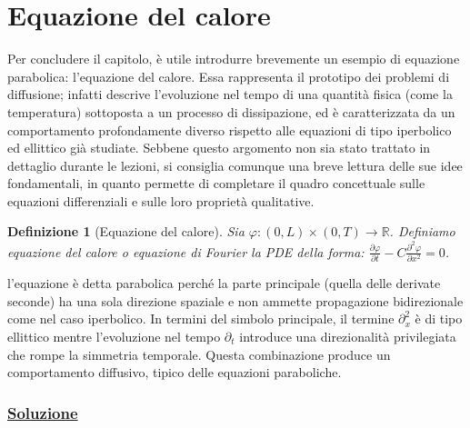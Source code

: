 \documentclass[a4paper,12pt]{report}
\newtheorem{definizione}{Definizione}[chapter]
\newcommand{\pd}[2]{\frac{\partial #1}{\partial #2}}
\newcommand{\pdd}[2]{\frac{\partial^2 #1}{\partial #2^2}}
\begin{document}
\section{Equazione del calore}

Per concludere il capitolo, è utile introdurre brevemente un esempio di equazione parabolica: l’equazione del calore. Essa rappresenta il prototipo dei problemi di diffusione; infatti descrive l’evoluzione nel tempo di una quantità fisica (come la temperatura) sottoposta a un processo di dissipazione, ed è caratterizzata da un comportamento profondamente diverso rispetto alle equazioni di tipo iperbolico ed ellittico già studiate. Sebbene questo argomento non sia stato trattato in dettaglio durante le lezioni, si consiglia comunque una breve lettura delle sue idee fondamentali, in quanto permette di completare il quadro concettuale sulle equazioni differenziali e sulle loro proprietà qualitative.

\begin{definizione}[Equazione del calore]
    Sia $\varphi:(0,L)\times(0,T)\to \mathbb{R}$. Definiamo equazione del calore o equazione di Fourier la PDE della forma: $\displaystyle\pd{\varphi}{t}-C\pdd{\varphi}{x}=0$.
\end{definizione}

l’equazione è detta parabolica perché la parte principale (quella delle derivate seconde) ha una sola direzione spaziale e non ammette propagazione bidirezionale come nel caso iperbolico. In termini del simbolo principale, il termine $\partial_x^2$ è di tipo ellittico mentre l’evoluzione nel tempo $\partial_t$ introduce una direzionalità privilegiata che rompe la simmetria temporale. Questa combinazione produce un comportamento diffusivo, tipico delle equazioni paraboliche.

\subsubsection{\underline{Soluzione}}
\end{document}
